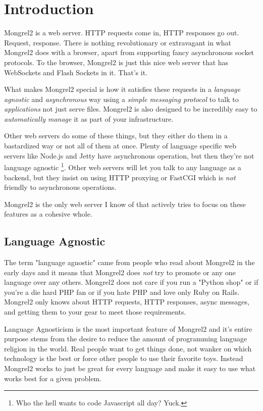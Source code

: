\chapter{Introduction}

Mongrel2 is a web server.  HTTP requests come in, HTTP responses go out.
Request, response.  There is nothing revolutionary or extravagant in what
Mongrel2 does with a browser, apart from supporting fancy asynchronous socket
protocols.  To the browser, Mongrel2 is just this nice web server that has
WebSockets and Flash Sockets in it.  That's it.

What makes Mongrel2 special is how it satisfies these requests in a \emph{
language agnostic} and \emph{asynchronous} way using a \emph{simple messaging
protocol} to talk to \emph{applications} not just serve files.  Mongrel2 is also
designed to be incredibly easy to \emph{automatically manage} it as part of your
infrastructure.

Other web servers do some of these things, but they either do them in a bastardized
way or not all of them at once.  Plenty of language specific web servers like Node.js
and Jetty have asynchronous operation, but then they're not language agnostic
\footnote{Who the hell wants to code Javascript all day?  Yuck.}.  Other web servers
will let you talk to any language as a backend, but they insist on using HTTP
proxying or FastCGI which is \emph{not} friendly to asynchronous operations.

Mongrel2 is the only web server I know of that actively tries to focus on these
features as a cohesive whole.


\section{Language Agnostic}

The term "language agnostic" came from people who read about Mongrel2 in the
early days and it means that Mongrel2 does \emph{not} try to promote or any one
language over any others.  Mongrel2 does not care if you run a "Python shop" or
if you're a die hard PHP fan or if you hate PHP and love only Ruby on Rails.
Mongrel2 only knows about HTTP requests, HTTP responses, async messages, and
getting them to your gear to meet those requirements.

Language Agnosticism is the most important feature of Mongrel2 and it's entire
purpose stems from the desire to reduce the amount of programming language 
religion in the world.  Real people want to get things done, not wanker on 
which technology is the best or force other people to use their favorite toys.
Instead Mongrel2 works to just be great for every language and make it easy
to use what works best for a given problem.


